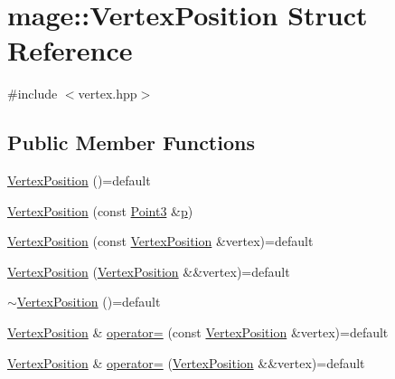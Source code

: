 \hypertarget{structmage_1_1_vertex_position}{}\section{mage\+:\+:Vertex\+Position Struct Reference}
\label{structmage_1_1_vertex_position}


{\ttfamily \#include $<$vertex.\+hpp$>$}

\subsection*{Public Member Functions}
\begin{DoxyCompactItemize}
\item 
\hyperlink{structmage_1_1_vertex_position_a2e6037836e67cdf5c43fc9abfa0d3753}{Vertex\+Position} ()=default
\item 
\hyperlink{structmage_1_1_vertex_position_aca7867e7a2d0cb50f32283dd91bb2aed}{Vertex\+Position} (const \hyperlink{structmage_1_1_point3}{Point3} \&\hyperlink{structmage_1_1_vertex_position_ad9c3ea68e2c1745446387d1eca28f25f}{p})
\item 
\hyperlink{structmage_1_1_vertex_position_aa77211e4b45efed3d57f3170b9df6787}{Vertex\+Position} (const \hyperlink{structmage_1_1_vertex_position}{Vertex\+Position} \&vertex)=default
\item 
\hyperlink{structmage_1_1_vertex_position_ae00cb7667e411fefa4052b80a47ccfff}{Vertex\+Position} (\hyperlink{structmage_1_1_vertex_position}{Vertex\+Position} \&\&vertex)=default
\item 
\hyperlink{structmage_1_1_vertex_position_ae78ac5fd76f3217ec72435beaa34ed6e}{$\sim$\+Vertex\+Position} ()=default
\item 
\hyperlink{structmage_1_1_vertex_position}{Vertex\+Position} \& \hyperlink{structmage_1_1_vertex_position_a07e7df87f6f70556d98c856a47643b73}{operator=} (const \hyperlink{structmage_1_1_vertex_position}{Vertex\+Position} \&vertex)=default
\item 
\hyperlink{structmage_1_1_vertex_position}{Vertex\+Position} \& \hyperlink{structmage_1_1_vertex_position_a37000c522dc4d0078ac879dc46532911}{operator=} (\hyperlink{structmage_1_1_vertex_position}{Vertex\+Position} \&\&vertex)=default
\end{DoxyCompactItemize}
